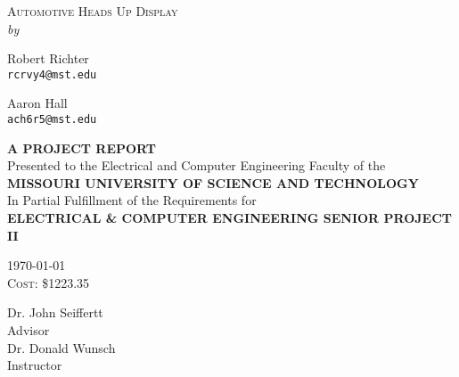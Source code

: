 \begin{titlepage}

\begin{center}
\textsc{\LARGE Automotive Heads Up Display} \\[2cm]

\textit{by} \\[0.5cm]

\begin{multicols}{2}
Robert Richter\\
\texttt{rcrvy4@mst.edu}\\

\columnbreak

Aaron Hall\\
\texttt{ach6r5@mst.edu}
\end{multicols}

\vspace{3 cm}

\textsc{\small \textbf{A PROJECT REPORT}} \\[0.5cm]
{\small Presented to the Electrical and Computer Engineering Faculty of the} \\[0.5cm]
\textsc{\small \textbf{MISSOURI UNIVERSITY OF SCIENCE AND TECHNOLOGY}} \\[0.5cm]
{\small In Partial Fulfillment of the Requirements for} \\[0.5cm]
\textsc{\small \textbf{ELECTRICAL \& COMPUTER ENGINEERING SENIOR PROJECT II}} \\[1cm]

\vfill

\textsc{\today} \\[3mm]
\textsc{Cost: \$1223.35} \\[2cm]

\begin{multicols}{2}
\large{Dr. John Seiffertt} \\
\vspace{1mm}
Advisor\\
\columnbreak
\large{Dr. Donald Wunsch} \\
\vspace{1mm}
Instructor
\end{multicols}

\end{center}
\end{titlepage}
